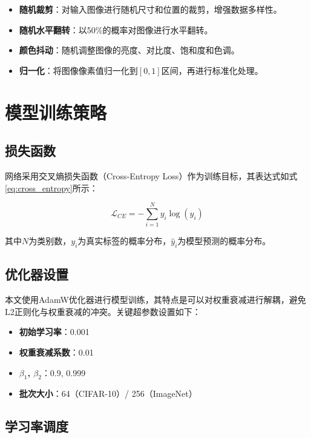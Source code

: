 \begin{itemize}
    \item \textbf{随机裁剪}：对输入图像进行随机尺寸和位置的裁剪，增强数据多样性。
    \item \textbf{随机水平翻转}：以50\%的概率对图像进行水平翻转。
    \item \textbf{颜色抖动}：随机调整图像的亮度、对比度、饱和度和色调。
    \item \textbf{归一化}：将图像像素值归一化到$[0, 1]$区间，再进行标准化处理。
\end{itemize}

\section{模型训练策略}

\subsection{损失函数}

网络采用交叉熵损失函数（Cross-Entropy Loss）作为训练目标，其表达式如式\eqref{eq:cross_entropy}所示：

\begin{equation}
    \mathcal{L}_{CE} = -\sum_{i=1}^{N} y_i \log(\hat{y}_i)
    \label{eq:cross_entropy}
\end{equation}

其中$N$为类别数，$y_i$为真实标签的概率分布，$\hat{y}_i$为模型预测的概率分布。

\subsection{优化器设置}

本文使用AdamW优化器进行模型训练，其特点是可以对权重衰减进行解耦，避免L2正则化与权重衰减的冲突。关键超参数设置如下：

\begin{itemize}
    \item \textbf{初始学习率}：0.001
    \item \textbf{权重衰减系数}：0.01
    \item \textbf{$\beta_1$, $\beta_2$}：0.9, 0.999
    \item \textbf{批次大小}：64（CIFAR-10）/ 256（ImageNet）
\end{itemize}

\subsection{学习率调度}

